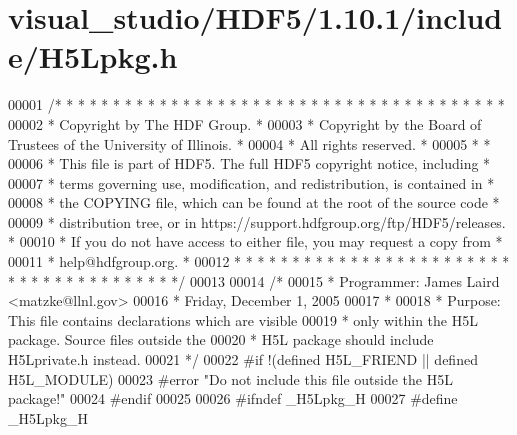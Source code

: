 \hypertarget{visual__studio_2_h_d_f5_21_810_81_2include_2_h5_lpkg_8h_source}{}\section{visual\+\_\+studio/\+H\+D\+F5/1.10.1/include/\+H5\+Lpkg.h}
\label{visual__studio_2_h_d_f5_21_810_81_2include_2_h5_lpkg_8h_source}

\begin{DoxyCode}
00001 \textcolor{comment}{/* * * * * * * * * * * * * * * * * * * * * * * * * * * * * * * * * * * * * * *}
00002 \textcolor{comment}{ * Copyright by The HDF Group.                                               *}
00003 \textcolor{comment}{ * Copyright by the Board of Trustees of the University of Illinois.         *}
00004 \textcolor{comment}{ * All rights reserved.                                                      *}
00005 \textcolor{comment}{ *                                                                           *}
00006 \textcolor{comment}{ * This file is part of HDF5.  The full HDF5 copyright notice, including     *}
00007 \textcolor{comment}{ * terms governing use, modification, and redistribution, is contained in    *}
00008 \textcolor{comment}{ * the COPYING file, which can be found at the root of the source code       *}
00009 \textcolor{comment}{ * distribution tree, or in https://support.hdfgroup.org/ftp/HDF5/releases.  *}
00010 \textcolor{comment}{ * If you do not have access to either file, you may request a copy from     *}
00011 \textcolor{comment}{ * help@hdfgroup.org.                                                        *}
00012 \textcolor{comment}{ * * * * * * * * * * * * * * * * * * * * * * * * * * * * * * * * * * * * * * */}
00013 
00014 \textcolor{comment}{/*}
00015 \textcolor{comment}{ * Programmer: James Laird <matzke@llnl.gov>}
00016 \textcolor{comment}{ *             Friday, December 1, 2005}
00017 \textcolor{comment}{ *}
00018 \textcolor{comment}{ * Purpose:     This file contains declarations which are visible}
00019 \textcolor{comment}{ *              only within the H5L package. Source files outside the}
00020 \textcolor{comment}{ *              H5L package should include H5Lprivate.h instead.}
00021 \textcolor{comment}{ */}
00022 \textcolor{preprocessor}{#if !(defined H5L\_FRIEND || defined H5L\_MODULE)}
00023 \textcolor{preprocessor}{#error "Do not include this file outside the H5L package!"}
00024 \textcolor{preprocessor}{#endif}
00025 
00026 \textcolor{preprocessor}{#ifndef \_H5Lpkg\_H}
00027 \textcolor{preprocessor}{#define \_H5Lpkg\_H}

\end{DoxyCode}
